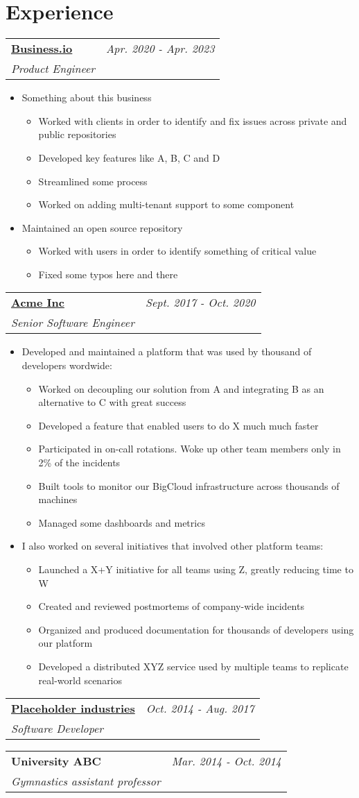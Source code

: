 \documentclass[letterpaper,11pt]{article}
\makeatletter
\newcommand{\summary}[1]{
  \item\small{
    #1 \vspace{-4pt}
  }
}
\newcommand{\heading}[3]{
  \begin{tabular*}{0.99\textwidth}[t]{l@{\extracolsep{\fill}}r}
    \textbf{#1} & \textit{\small #2} \\
    \textit{\small#3} \\
  \end{tabular*}\vspace{-2pt}
}
\newcommand{\itemListStart}{\begin{itemize}}
\newcommand{\itemListEnd}{\end{itemize}\vspace{-5pt}}
\makeatother
\begin{document}
  \section{Experience}
  \heading{\href{https://www.business.io/PLACEHOLDER}{Business.io}}{Apr. 2020 - Apr. 2023}
  {Product Engineer}
  \itemListStart
    \summary {Something about this business}
    \begin{itemize}
      \item {Worked with clients in order to identify and fix issues across private and public repositories}
      \item {Developed key features like A, B, C and D}
      \item {Streamlined some process}
      \item {Worked on adding multi-tenant support to some component}
    \end{itemize}
    \summary {Maintained an open source repository}
    \begin{itemize}
      \item {Worked with users in order to identify something of critical value}
      \item {Fixed some typos here and there}
    \end{itemize}
  \itemListEnd
  \heading{\href{https://en.wikipedia.org/wiki/PLACEHOLDER}{Acme Inc}}{Sept. 2017 - Oct. 2020}
  {Senior Software Engineer}
  \itemListStart
    \summary
    {Developed and maintained a platform that was used by thousand of developers wordwide:}
    \begin{itemize}
      \item {Worked on decoupling our solution from A and integrating B as an alternative to C with great success}
      \item {Developed a feature that enabled users to do X much much faster}
      \item {Participated in on-call rotations. Woke up other team members only in 2\% of the incidents}
      \item {Built tools to monitor our BigCloud infrastructure across thousands of machines}
      \item {Managed some dashboards and metrics}
    \end{itemize}
    \summary {I also worked on several initiatives that involved other platform teams:}
    \begin{itemize}
      \item {Launched a X+Y initiative for all teams using Z, greatly reducing time to W}
      \item {Created and reviewed postmortems of company-wide incidents}
      \item {Organized and produced documentation for thousands of developers using our platform}
      \item {Developed a distributed XYZ service used by multiple teams to replicate real-world scenarios}
    \end{itemize}
  \itemListEnd
  \heading{\href{https://page.com/PLACEHOLDER}{Placeholder industries}}{Oct. 2014 - Aug. 2017}{Software Developer}
  \heading{University ABC}{Mar. 2014 - Oct. 2014}{Gymnastics assistant professor}
\end{document}
